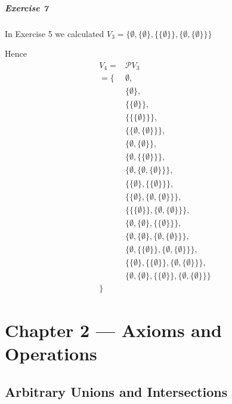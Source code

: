 \documentclass{report}
\begin{document}
    \paragraph{Exercise 7}
    In Exercise 5 we calculated $V_3 = \{ \emptyset, \{ \emptyset \}, \{ \{ \emptyset \} \},
    \{ \emptyset, \{ \emptyset \} \} \}$

    Hence
    \begin{align*}
    V_4 = & \mathcal{P} V_3 \\
    = \{ & \emptyset, \\
    & \{ \emptyset \}, \\
    & \{ \{ \emptyset \} \}, \\
    & \{ \{ \{ \emptyset \} \} \}, \\
    & \{ \{ \emptyset, \{ \emptyset \} \} \}, \\
    & \{ \emptyset, \{ \emptyset \} \}, \\
    & \{ \emptyset, \{ \{ \emptyset \} \} \}, \\
    & \{ \emptyset, \{ \emptyset, \{ \emptyset \} \} \}, \\
    & \{ \{ \emptyset \}, \{ \{ \emptyset \} \} \}, \\
    & \{ \{ \emptyset \}, \{ \emptyset, \{ \emptyset \} \} \}, \\
    & \{ \{ \{ \emptyset \} \}, \{ \emptyset, \{ \emptyset \} \} \}, \\
    & \{ \emptyset, \{ \emptyset \}, \{ \{ \emptyset \} \} \}, \\
    & \{ \emptyset, \{ \emptyset \}, \{ \emptyset, \{ \emptyset \} \} \}, \\
    & \{ \emptyset, \{ \{ \emptyset \} \}, \{ \emptyset, \{ \emptyset \} \} \}, \\
    & \{ \{ \emptyset \}, \{ \{ \emptyset \} \}, \{ \emptyset, \{ \emptyset \} \} \}, \\
    & \{ \emptyset, \{ \emptyset \}, \{ \{ \emptyset \} \},
    \{ \emptyset, \{ \emptyset \} \} \} \\
    \}
    \end{align*}

    \chapter{Chapter 2 --- Axioms and Operations}

    \section{Arbitrary Unions and Intersections}
\end{document}

